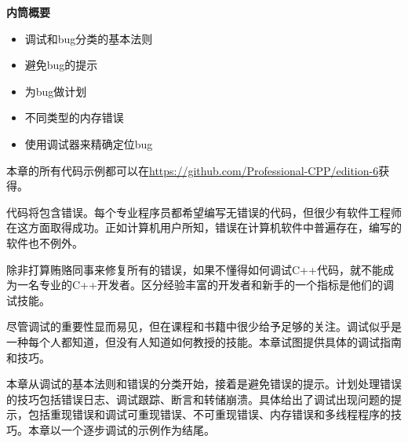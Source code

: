 \noindent
\textbf{内筒概要}

\begin{itemize}
\item
调试和bug分类的基本法则

\item
避免bug的提示

\item
为bug做计划

\item
不同类型的内存错误

\item
使用调试器来精确定位bug
\end{itemize}

本章的所有代码示例都可以在\url{https://github.com/Professional-CPP/edition-6}获得。

代码将包含错误。每个专业程序员都希望编写无错误的代码，但很少有软件工程师在这方面取得成功。正如计算机用户所知，错误在计算机软件中普遍存在，编写的软件也不例外。

除非打算贿赂同事来修复所有的错误，如果不懂得如何调试C++代码，就不能成为一名专业的C++开发者。区分经验丰富的开发者和新手的一个指标是他们的调试技能。

尽管调试的重要性显而易见，但在课程和书籍中很少给予足够的关注。调试似乎是一种每个人都知道，但没有人知道如何教授的技能。本章试图提供具体的调试指南和技巧。

本章从调试的基本法则和错误的分类开始，接着是避免错误的提示。计划处理错误的技巧包括错误日志、调试跟踪、断言和转储崩溃。具体给出了调试出现问题的提示，包括重现错误和调试可重现错误、不可重现错误、内存错误和多线程程序的技巧。本章以一个逐步调试的示例作为结尾。

